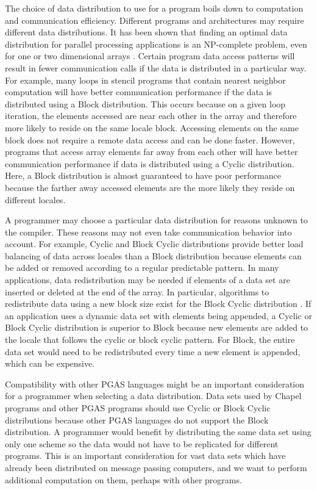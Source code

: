 The choice of data distribution to use for a program boils down to computation and communication efficiency. Different programs and architectures may require different data distributions. It has been shown that finding an optimal data distribution for parallel processing applications is an NP-complete problem, even for one or two dimensional arrays \cite{mace1987memory}. Certain program data access patterns will result in fewer communication calls if the data is distributed in a particular way. For example, many loops in stencil programs that contain nearest neighbor computation will have better communication performance if the data is distributed using a Block distribution. This occurs because on a given loop iteration, the elements accessed are near each other in the array and therefore more likely to reside on the same locale block. Accessing elements on the same block does not require a remote data access and can be done faster. However, programs that access array elements far away from each other will have better communication performance if data is distributed using a Cyclic distribution. Here, a Block distribution is almost guaranteed to have poor performance because the farther away accessed elements are the more likely they reside on different locales. 

A programmer may choose a particular data distribution for reasons unknown to the compiler. These reasons may not even take communication behavior into account. For example, Cyclic and Block Cyclic distributions provide better load balancing of data across locales than a Block distribution because elements can be added or removed according to a regular predictable pattern. In many applications, data redistribution may be needed if elements of a data set are inserted or deleted at the end of the array. In particular, algorithms to redistribute data using a new block size exist for the Block Cyclic distribution \cite{walker1996redistribution, prylli1997fast}. If an application uses a dynamic data set with elements being appended, a Cyclic or Block Cyclic distribution is superior to Block because new elements are added to the locale that follows the cyclic or block cyclic pattern. For Block, the entire data set would need to be redistributed every time a new element is appended, which can be expensive. 

Compatibility with other PGAS languages might be an important consideration for a programmer when selecting a data distribution. Data sets used by Chapel programs and other PGAS programs should use Cyclic or Block Cyclic distributions because other PGAS languages do not support the Block distribution. A programmer would benefit by distributing the same data set using only one scheme so the data would not have to be replicated for different programs. This is an important consideration for vast data sets which have already been distributed on message passing computers, and we want to perform additional computation on them, perhaps with other programs.  

